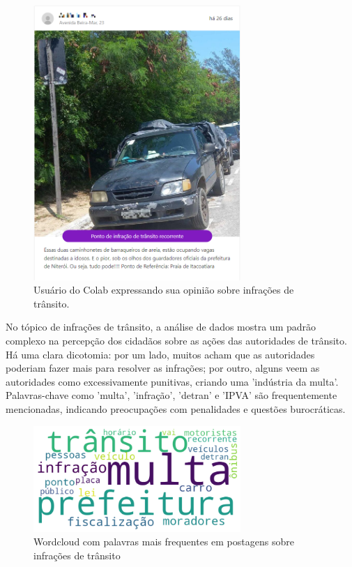 \begin{figure}[htb]
	\centering
	\includegraphics[width=0.7\textwidth]{images/colab_posts_traffic.png}
	\caption{Usuário do Colab expressando sua opinião sobre infrações de trânsito.}
	\label{fig:colab_posts_traffic}
\end{figure}

No tópico de infrações de trânsito, a análise de dados mostra um padrão complexo na percepção dos cidadãos sobre as ações das autoridades de trânsito. Há uma clara dicotomia: por um lado, muitos acham que as autoridades poderiam fazer mais para resolver as infrações; por outro, alguns veem as autoridades como excessivamente punitivas, criando uma 'indústria da multa'. Palavras-chave como 'multa', 'infração', 'detran' e 'IPVA' são frequentemente mencionadas, indicando preocupações com penalidades e questões burocráticas.

\begin{figure}[htb]
	\centering
	\includegraphics[width=0.7\textwidth]{images/wordcloud_traffic.png}
	\caption{Wordcloud com palavras mais frequentes em postagens sobre infrações de trânsito}
	\label{fig:wordcloud_traffic}
\end{figure}

